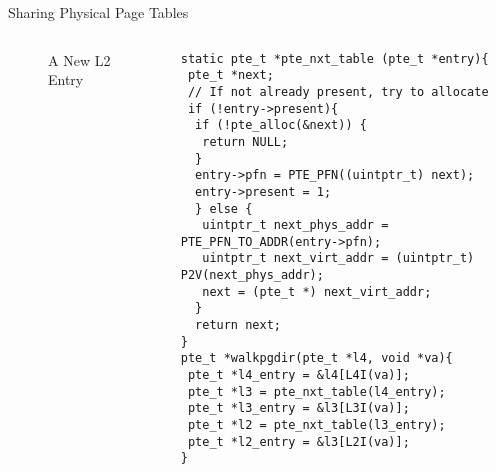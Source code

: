 \documentclass[aspectratio=169,xcolor=dvipsnames]{beamer}
\begin{document}
\begin{frame}[fragile]{Sharing Physical Page Tables}
\begin{columns}[c]
\begin{figure}
\begin{tikzpicture}[x=0.75pt,y=0.75pt,yscale=-0.5,xscale=0.5]
\end{tikzpicture}
        \caption{A New L2 Entry}
        \label{fig:enter-label}
    \end{figure}
\begin{lstlisting}[style=CStyleNum, basicstyle=\tiny]
static pte_t *pte_nxt_table (pte_t *entry){
 pte_t *next;
 // If not already present, try to allocate
 if (!entry->present){
  if (!pte_alloc(&next)) {
   return NULL;
  }
  entry->pfn = PTE_PFN((uintptr_t) next);
  entry->present = 1;
  } else {
   uintptr_t next_phys_addr = PTE_PFN_TO_ADDR(entry->pfn);        
   uintptr_t next_virt_addr = (uintptr_t) P2V(next_phys_addr);
   next = (pte_t *) next_virt_addr;
  }
  return next;
}   
pte_t *walkpgdir(pte_t *l4, void *va){ 
 pte_t *l4_entry = &l4[L4I(va)];
 pte_t *l3 = pte_nxt_table(l4_entry);
 pte_t *l3_entry = &l3[L3I(va)];
 pte_t *l2 = pte_nxt_table(l3_entry);
 pte_t *l2_entry = &l3[L2I(va)];
}

\end{lstlisting}
\end{columns}
\end{frame}
\end{document}
